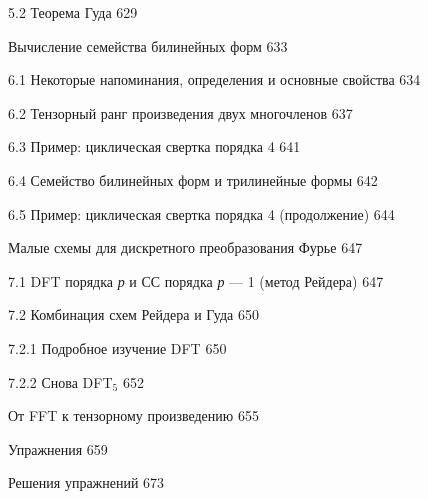 \documentclass{mai_book}
\begin{document}
{5.2 Теорема Гуда \dotfill \hspace{0.5cm} 629

 \hspace{0.05cm} Вычисление семейства билинейных форм \dotfill \hspace{0.5cm} 633

6.1 Некоторые напоминания, определения и основные свойства \dotfill \hspace{0.5cm} 634

6.2 Тензорный ранг произведения двух многочленов \dotfill \hspace{0.5cm} 637 
 
6.3 Пример: циклическая свертка порядка 4 \dotfill \hspace{0.5cm} \hspace{0.5cm} 641

\newpage
{}
6.4 Семейство билинейных форм и трилинейные формы \dotfill \hspace{0.5cm} 642 
  
6.5 Пример: циклическая свертка порядка 4 (продолжение) \dotfill \hspace{0.5cm} 644
  
 Малые схемы для дискретного преобразования Фурье \dotfill \hspace{0.5cm} 647 

7.1 DFT порядка \emph{р} и СС порядка \emph{р} --- 1 (метод Рейдера) \dotfill \hspace{0.5cm} 647 

7.2 Комбинация схем Рейдера и Гуда\dotfill \hspace{0.5cm} 650

\hspace{0.5cm}7.2.1 Подробное изучение DFT \dotfill \hspace{0.5cm} 650

\hspace{0.5cm}7.2.2 Снова D\small{FT}$_{5}$ \dotfill \hspace{0.5cm} 652 

 От FFT к тензорному произведению \dotfill \hspace{0.5cm} 655

 \noindent Упражнения \dotfill \hspace{0.5cm} 659 

\noindent Решения упражнений \dotfill \hspace{0.5cm} 673
\newline

}
\end{document}
